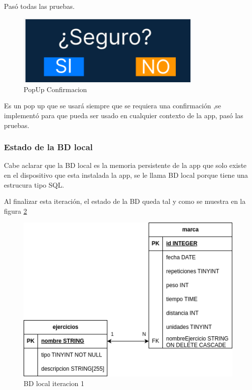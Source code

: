Pasó todas las pruebas.


\begin{figure}[H]
   \centering
    \includegraphics[width=0.8\textwidth]{pantallas/PopUpConfirmacion.png}
    \caption{PopUp Confirmacion}
    \label{fig:PopUpConfirmacion}
\end{figure}

Es un pop up que se usará siempre que se requiera una confirmación ,se implementó para que pueda ser usado en cualquier contexto de la app, pasó las pruebas.

\subsubsection{Estado de la BD local}

Cabe aclarar que la BD local es la memoria persistente de la app que solo existe en el dispositivo que esta instalada la app, se le llama BD local porque tiene una estrucura tipo SQL.

Al finalizar esta iteración, el estado de la BD queda tal y como se muestra en la figura \cref{fig:BD local iteracion 1}
\begin{figure}[H]
   \centering
    \includegraphics[width=\textwidth]{fotos/BDL iteracion 1.png}
    \caption{BD local iteracion 1}
    \label{fig:BD local iteracion 1}
\end{figure}

